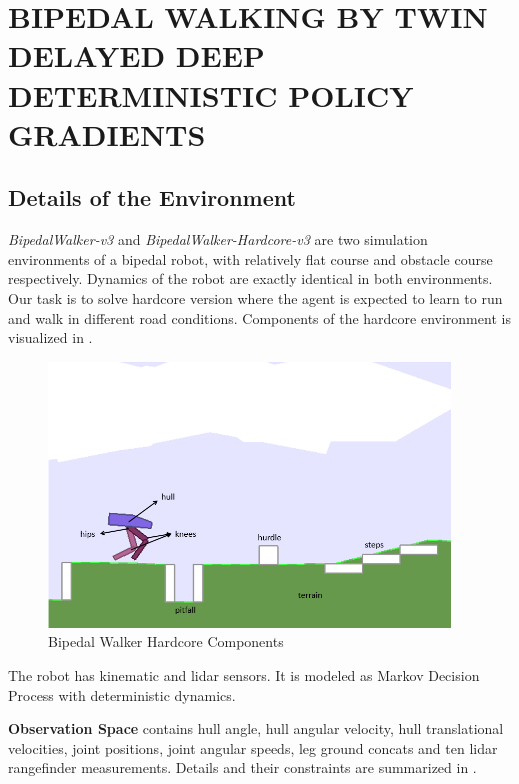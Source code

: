 \chapter{BIPEDAL WALKING BY TWIN DELAYED DEEP DETERMINISTIC POLICY GRADIENTS}
\label{chap:exp_setup}

\section{Details of the Environment}

\textit{BipedalWalker-v3} and \textit{BipedalWalker-Hardcore-v3} are two simulation environments of a bipedal robot, 
with relatively flat course and obstacle course respectively. 
Dynamics of the robot are exactly identical in both environments. 
Our task is to solve hardcore version where the agent is expected to learn to run and walk in different road conditions. 
Components of the hardcore environment is visualized in . 

\begin{figure}
	\centering
	\includegraphics[width=0.95\textwidth]{figures/bipedal/bpedal_annotated.png}
	\caption{Bipedal Walker Hardcore Components~\cite{noauthor_bipedalwalkerhardcore-v2_2021}}
	\label{fig:bipedal_hardcore_components}
\end{figure}

The robot has kinematic and lidar sensors. 
It is modeled as Markov Decision Process with deterministic dynamics. 

\textbf{Observation Space} contains hull angle, hull angular velocity, hull translational velocities, joint positions, joint angular speeds, leg ground concats and ten lidar rangefinder measurements. Details and their constraints are summarized in . 

